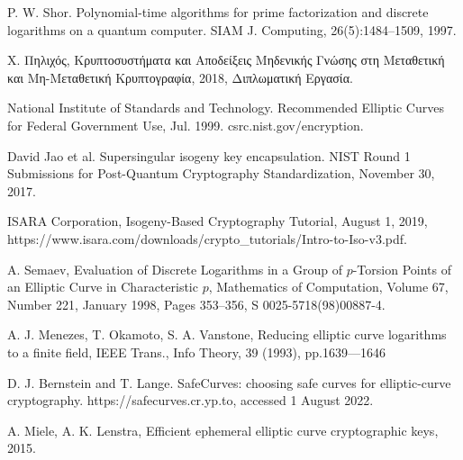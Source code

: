 \documentclass[oneside,a4paper]{article}
\begin{document}
\begin{thebibliography}{}
	P. W. Shor. Polynomial-time algorithms for prime factorization and discrete logarithms on a quantum computer. SIAM J. Computing, 26(5):1484–1509, 1997.
	
	Χ. Πηλιχός, Κρυπτοσυστήματα και Αποδείξεις Μηδενικής Γνώσης στη Μεταθετική και Μη-Μεταθετική Κρυπτογραφία, 2018, Διπλωματική Εργασία.
	
	National Institute of Standards and Technology. Recommended Elliptic Curves for Federal Government Use, Jul. 1999. csrc.nist.gov/encryption.

	David Jao et al. Supersingular isogeny key encapsulation. NIST Round 1 Submissions for Post-Quantum Cryptography Standardization, November 30, 2017.

	ISARA Corporation, Isogeny-Based Cryptography Tutorial, August 1, 2019,  https://www.isara.com/downloads/crypto\_tutorials/Intro-to-Iso-v3.pdf.

	A. Semaev, Evaluation of Discrete Logarithms in a Group of $p$-Torsion Points of an Elliptic Curve in Characteristic $p$, Mathematics of Computation, Volume 67, Number 221, January 1998, Pages 353–356, S 0025-5718(98)00887-4.

	A. J. Menezes, T. Okamoto, S. A. Vanstone, Reducing elliptic curve logarithms to a finite field, IEEE Trans., Info Theory, 39 (1993), pp.1639—1646

	D. J. Bernstein and T. Lange. SafeCurves: choosing safe curves for elliptic-curve cryptography. https://safecurves.cr.yp.to, accessed 1 August 2022. 

	A. Miele, A. K. Lenstra, Efficient ephemeral elliptic curve cryptographic keys, 2015.
\end{thebibliography}
\endgroup


\end{document}
